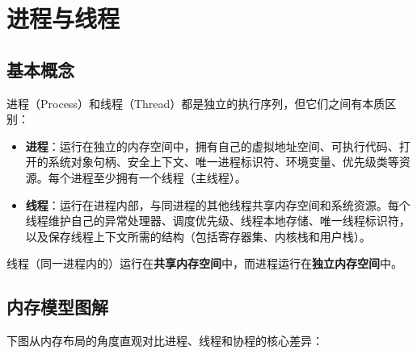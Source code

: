 \section{进程与线程}

\subsection{基本概念}

进程（Process）和线程（Thread）都是独立的执行序列，但它们之间有本质区别：

\begin{itemize}[leftmargin=1.5em]
    \item \textbf{进程}：运行在独立的内存空间中，拥有自己的虚拟地址空间、可执行代码、打开的系统对象句柄、安全上下文、唯一进程标识符、环境变量、优先级类等资源。每个进程至少拥有一个线程（主线程）。
    \item \textbf{线程}：运行在进程内部，与同进程的其他线程共享内存空间和系统资源。每个线程维护自己的异常处理器、调度优先级、线程本地存储、唯一线程标识符，以及保存线程上下文所需的结构（包括寄存器集、内核栈和用户栈）。
\end{itemize}

\begin{notebox}[核心区别]
线程（同一进程内的）运行在\textbf{共享内存空间}中，而进程运行在\textbf{独立内存空间}中。
\end{notebox}

\subsection{内存模型图解}

下图从内存布局的角度直观对比进程、线程和协程的核心差异：

